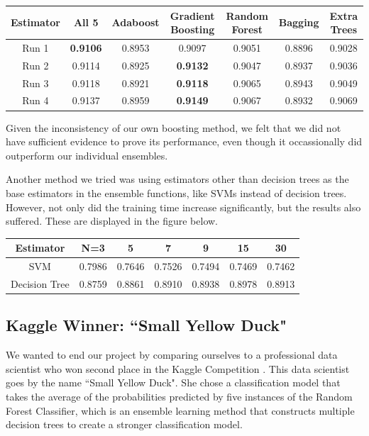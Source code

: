 \documentclass{article} %
\begin{document}
\begin{adjustbox}{width=\textwidth,totalheight=\textheight,keepaspectratio}
\begin{tabular}
{c|cccccc}
Estimator & All 5 & Adaboost & Gradient Boosting & Random Forest & Bagging & Extra Trees\\
\hline
Run 1 & \textbf{0.9106} & 0.8953 & 0.9097 & 0.9051 & 0.8896 & 0.9028\\
Run 2 & 0.9114 & 0.8925 & \textbf{0.9132} & 0.9047 & 0.8937 & 0.9036\\
Run 3 & 0.9118 & 0.8921 & \textbf{0.9118} & 0.9065 & 0.8943 & 0.9049\\
Run 4 & 0.9137 & 0.8959 & \textbf{0.9149} & 0.9067 & 0.8932 & 0.9069
\end{tabular}
\end{adjustbox}

Given the inconsistency of our own boosting method, we felt that we did not have
sufficient evidence to prove its performance, even though it occassionally did
outperform our individual ensembles.

Another method we tried was using estimators other than decision trees as the
base estimators in the ensemble functions, like SVMs instead of decision trees.
However, not only did the training time increase significantly, but the results
also suffered. These are displayed in the figure below.

\begin{tabular}
{c|cccccc}
Estimator & N=3 & 5 & 7 & 9 & 15 & 30\\
\hline
SVM & 0.7986 & 0.7646 & 0.7526 & 0.7494 & 0.7469 & 0.7462\\
Decision Tree & 0.8759 & 0.8861 & 0.8910 & 0.8938 & 0.8978 & 0.8913
\end{tabular}

\subsection{Kaggle Winner: ``Small Yellow Duck"}

We wanted to end our project by comparing ourselves to a professional data scientist who won second place in the Kaggle Competition \cite{SYD}. This data scientist goes by the name ``Small Yellow Duck".
She chose a classification model that takes the average of the probabilities predicted by five instances of the Random Forest Classifier, which is an ensemble learning method that constructs multiple decision trees to create a stronger classification model.
\end{document}
